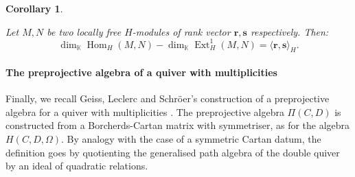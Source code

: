 \documentclass[11pt,english]{article}
\numberwithin{equation}{section}
\numberwithin{figure}{section}
\theoremstyle{definition}
\theoremstyle{plain}
\newtheorem{cor}[df]{Corollary}
\theoremstyle{remark}
\DeclareMathOperator{\Hom}{Hom}
\DeclareMathOperator{\Ext}{Ext}
\newcommand\rr{\mathbf{r}}
\newcommand\KK{\mathbb{K}}
\begin{document}
\begin{cor}{\cite[Prop. 4.1.]{GLS17a}}

Let $M,N$ be two locally free $H$-modules of rank vector $\rr,\mathbf{s}$
respectively. Then:\[
\dim_{\KK}\Hom_H(M,N)-\dim_{\KK}\Ext^1_H(M,N)=\langle \rr,\mathbf{s}\rangle_H.
\]

\end{cor}

\paragraph*{The preprojective algebra of a quiver with multiplicities}

Finally, we recall Geiss, Leclerc and Schröer's construction of a
preprojective algebra for a quiver with multiplicities \cite{GLS17a}.
The preprojective algebra $\Pi(C,D)$ is constructed from a Borcherds-Cartan
matrix with symmetriser, as for the algebra $H(C,D,\Omega)$. By analogy
with the case of a symmetric Cartan datum, the definition goes by
quotienting the generalised path algebra of the double quiver by an
ideal of quadratic relations.
\end{document}
